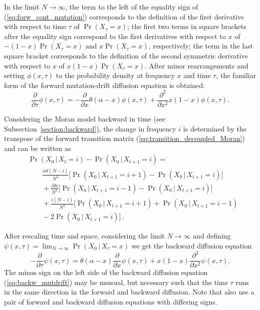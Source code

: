 \documentclass[preprint]{elsarticle}
\newcommand\given{{\,|\,}}
\newcommand\x[1]{\ensuremath{X_{#1}}}
\begin{document}

In the limit $N \to \infty$, the term to the left of the equality sign of (\ref{eq:forw_cont_mutation}) corresponds to the definition of the first derivative with respect to time $\tau$ of $\Pr(\x{\tau}=x)$; the first two terms in square brackets after the equality sign correspond to the first derivatives with respect to $x$ of $-(1-x)\Pr(\x{\tau}=x)$ and $x\Pr(\x{\tau}=x)$, respectively; the term in the last square bracket corresponds to the definition of the second symmetric derivative with respect to $x$ of $x(1-x)\Pr(\x{\tau}=x)$.  After minor rearrangements and setting $\phi(x,\tau)$ to the probability density at frequency $x$ and time $\tau$, the familiar form of the forward mutation-drift diffusion equation is obtained:
\begin{equation}\label{eq:forw_mutdrift}
\frac{\partial}{\partial \tau} \phi(x,\tau) = -\frac{\partial}{\partial x}\theta(\alpha-x)\phi(x,\tau) +\frac{\partial^2}{\partial x^2}x(1-x)\phi(x,\tau).
\end{equation}

Considering the Moran model backward in time (see Subsection~\ref{section:backward}), the change in frequency $i$ is determined by the transpose of the forward transition matrix (\ref{eq:transition_decoupled_Moran}) and can be written as
\begin{equation}\label{eq:back_discr_mutation}
\begin{split}
&\Pr(\x{0} \given\x{t}=i)-\Pr(\x{0}\given\x{t+1}=i) = \\
&\qquad \frac{\alpha \theta (N-i)}{N^2} \bigg[\Pr(\x{0}\given\x{t+1}=i+1)-\Pr(\x{0}\given\x{t+1}=i)\bigg]\\
&\qquad+ \frac{\beta \theta i}{N^2} \bigg[\Pr(\x{0}\given\x{t+1}=i-1)-\Pr(\x{0}\given\x{t+1}=i)\bigg]\\
&\qquad+ \frac{i(N-i)}{N^2} \bigg[\Pr(\x{0}\given\x{t+1}=i+1)+\Pr(\x{0}\given\x{t+1}=i-1)\\
&\qquad-2\Pr(\x{0}\given\x{t+1}=i)\bigg]\,.
\end{split}
\end{equation}

After rescaling time and space, considering the limit $N \to \infty$ and defining $\psi(x,\tau)=\lim_{N\to\infty}\Pr(\x{0}\given\x{\tau}=x)$ we get the backward diffusion equation
\begin{equation}\label{eq:backw_mutdrift}
-\frac{\partial}{\partial \tau} \psi(x,\tau) =
    \theta(\alpha-x)\frac{\partial}{\partial x} \psi(x,\tau) +x(1-x)\frac{\partial^2}{\partial x^2}\psi(x,\tau).
\end{equation}
The minus sign on the left side of the backward diffusion equation (\ref{eq:backw_mutdrift}) may be unusual, but necessary such that the time $\tau$ runs in the same direction in the forward and backward diffusion. Note that \citet{Zhao13a} also use a pair of forward and backward diffusion equations with differing signs.
\end{document}
